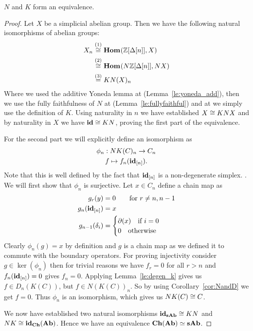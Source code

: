 \begin{theorem}
	$N$ and $K$ form an equivalence.
\end{theorem}
\begin{proof}
	Let $X$ be a simplicial abelian group. Then we have the following natural isomorphisms of abelian groups:
	\begin{align*}
		X_n &\stackrel{(1)}{\cong} \mathbf{Hom}_{}(\mathbb{Z}[\Delta[n]], X) \\
			&\stackrel{(2)}{\cong} \mathbf{Hom}_{}(N\mathbb{Z}[\Delta[n]], NX) \\
			&\stackrel{(3)}{=} KN(X)_n
	\end{align*}
	Where we used the additive Yoneda lemma at  (Lemma~\ref{le:yoneda_add}), then we use the fully faithfulness of $N$ at  (Lemma~\ref{le:fullyfaithful}) and at  we simply use the definition of $K$. Using naturality in $n$ we have established $X \cong KNX$ and by naturality in $X$ we have $\mathbf{id} \cong KN$, proving the first part of the equivalence.

	For the second part we will explicitly define an isomorphism as
	\begin{gather*}
		\phi_n: NK(C)_n \to C_n \\
		f \mapsto f_n(\mathbf{id}_{[n]}).
	\end{gather*}
	Note that this is well defined by the fact that $\mathbf{id}_{[n]}$ is a non-degenerate simplex. . We will first show that $\phi_n$ is surjective. Let $x \in C_n$ define a chain map as
	\begin{align*}
		g_r(y) &= 0 \qquad \text{for } r \neq n, n-1\\
		g_n(\mathbf{id}_{[n]}) &= x \\
		g_{n-1}(\delta_i) &= \begin{cases}
			\partial(x) \quad\text{if } i = 0 \\
			0 \quad\text{otherwise}
		\end{cases} \\
	\end{align*}
	Clearly $\phi_n(g) = x$ by definition and $g$ is a chain map as we defined it to commute with the boundary operators. For proving injectivity consider $g \in \ker(\phi_n)$ then for trivial reasons we have $f_r = 0$ for all $r > n$ and $f_n(\mathbf{id}_{[n]}) = 0$ gives $f_n = 0$. Applying Lemma~\ref{le:degen_k} gives us $f \in D_n(K(C))$, but $f \in N(K(C))_n$. So by using Corollary~\ref{cor:NandD} we get $f = 0$. Thus $\phi_n$ is an isomorphism, which gives us $NK(C) \cong C$.

	We now have established two natural isomorphisms $\mathbf{id}_{\mathbf{sAb}} \cong KN$ and $NK \cong \mathbf{id}_\mathbf{Ch}(\mathbf{Ab})$. Hence we have an equivalence $\mathbf{Ch}(\mathbf{Ab}) \simeq \mathbf{sAb}$.
\end{proof}

